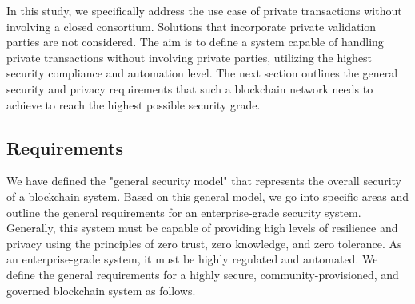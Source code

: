 In this study, we specifically address the use case of private transactions without involving a closed consortium. Solutions that incorporate private validation parties are not considered. The aim is to define a system capable of handling private transactions without involving private parties, utilizing the highest security compliance and automation level.
The next section outlines the general security and privacy requirements that such a blockchain network needs to achieve to reach the highest possible security grade. 

\subsection{Requirements}
We have defined the "general security model" that represents the overall security of a blockchain system. Based on this general model, we go into specific areas and outline the general requirements for an enterprise-grade security system. Generally, this system must be capable of providing high levels of resilience and privacy using the principles of zero trust, zero knowledge, and zero tolerance. As an enterprise-grade system, it must be highly regulated and automated. 
We define the general requirements for a highly secure, community-provisioned, and governed blockchain system as follows.         

